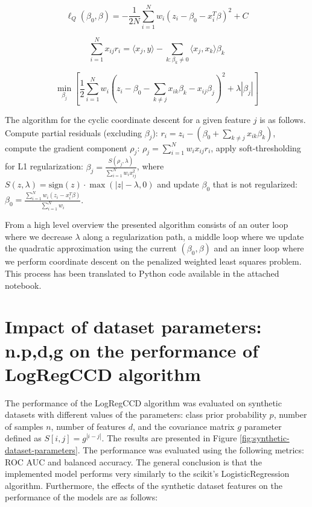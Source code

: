 \documentclass[11pt]{article}
\begin{document}
\begin{equation}\label{eq:quadratic-approximation}
\ell_Q(\beta_0, \beta) = -\frac{1}{2N} \sum_{i=1}^{N} w_i (z_i - \beta_0 - x_i^T \beta)^2 + C
\end{equation}


\begin{equation}\label{eq:covariance-update}
\sum_{i=1}^{N} x_{ij} r_i = \langle x_j, y \rangle - \sum_{k: \beta_k \neq 0} \langle x_j, x_k \rangle \beta_k
\end{equation}

\begin{equation}\label{eq:feature-minimization}
    \min_{\beta_j} \left[ \frac{1}{2} \sum_{i=1}^{N} w_i \left( z_i - \beta_0 - \sum_{k \neq j} x_{ik} \beta_k - x_{ij} \beta_j \right)^2 + \lambda |\beta_j| \right]
\end{equation}


The algorithm for the cyclic coordinate descent for a given feature $j$ is as follows. Compute partial residuals (excluding $\beta_j$): $r_i = z_i - (\beta_0 + \sum_{k \neq j} x_{ik} \beta_k)$, compute the gradient component $\rho_j$: $\rho_j = \sum_{i=1}^{N} w_i x_{ij} r_i$, apply soft-thresholding for L1 regularization: $\beta_j = \frac{S(\rho_j, \lambda)}{\sum_{i=1}^{N} w_i x_{ij}^2}$, where $S(z, \lambda) = \text{sign}(z) \cdot \max(|z| - \lambda, 0)$ and update $\beta_0$ that is not regularized: $\beta_0 = \frac{\sum_{i=1}^{N} w_i (z_i - x_i^T \beta)}{\sum_{i=1}^{N} w_i}$.


From a high level overview the presented algorithm consists of an outer loop where we decrease $\lambda$ along a regularization path, a middle loop where we update the quadratic approximation using the current $(\beta_0, \beta)$ and an inner loop where we perform coordinate descent on the penalized weighted least squares problem. This process has been translated to Python code available in the attached notebook.



\section{Impact of dataset parameters: n.p,d,g on the performance of LogRegCCD algorithm}

The performance of the LogRegCCD algorithm was evaluated on synthetic datasets with different values of the parameters: class prior probability $p$, number of samples $n$, number of features $d$, and the covariance matrix $g$ parameter defined as $S[i,j] = g^{|i-j|}$. The results are presented in Figure \ref{fig:synthetic-dataset-parameters}. The performance was evaluated using the following metrics: ROC AUC and balanced accuracy. The general conclusion is that the implemented model performs very similarly to the scikit's LogisticRegression algorithm. Furthermore, the effects of the synthetic dataset features on the performance of the models are as follows:
\end{document}
